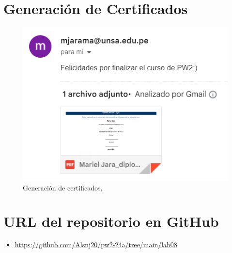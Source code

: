 \documentclass{article}
\begin{document}
\section{Generación de Certificados}
\begin{figure}[H]
	\centering
	\begin{minipage}{0.6\textwidth}
		\centering
		\includegraphics[width=\linewidth,keepaspectratio]{img/certificado.png}
		\caption{Generación de certificados.}
	\end{minipage}
\end{figure}
\section{URL del repositorio en GitHub}
\begin{itemize}
	\item \url{https://github.com/Alsnj20/pw2-24a/tree/main/lab08}
\end{itemize}
\pagebreak
\end{document}
